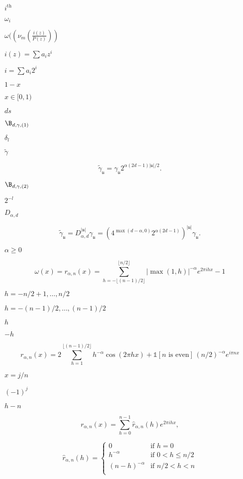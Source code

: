 \documentclass{article}
\begin{document}
$i^{\text{th}}$
\pagebreak

$\omega_i$
\pagebreak

$\omega((\nu_m(\frac{i(z)}{P(z)}))$
\pagebreak

$ i(z) = \sum a_iz^i$
\pagebreak

$i =\sum a_i2^i$
\pagebreak

$1 - x$
\pagebreak

$x \in [0,1)$
\pagebreak

$ d s $
\pagebreak

$\B_{d, \gamma, (1)}$
\pagebreak

$\delta_l $
\pagebreak

$\tilde{\gamma}$
\pagebreak

\[ \tilde{\gamma}_{\mathfrak u} = \gamma_{\mathfrak u} 2^{\alpha (2 d - 1) |\mathfrak u| / 2}.
\]
\pagebreak

$\B_{d, \gamma, (2)}$
\pagebreak

$ 2^{-l}$
\pagebreak

$D_{\alpha, d}$
\pagebreak

\[ \tilde{\gamma}_{\mathfrak u} = D_{\alpha, d}^{|\mathfrak u|} \gamma_{\mathfrak u} = \left(4^{\max(d-\alpha, 0)} 2^{\alpha (2 d - 1)}\right)^{|\mathfrak u|} \gamma_{\mathfrak u}.
\]
\pagebreak

$\alpha \geq 0$
\pagebreak

\[   \omega(x)
   = r_{\alpha,n}(x)
   = \sum_{h = -\lfloor (n-1)/2 \rfloor}^{\lfloor n/2 \rfloor}
     |\max(1, h)|^{-\alpha} e^{2 \pi i h x} - 1
\]
\pagebreak

$h=-n/2+1,\dots,n/2$
\pagebreak

$h=-(n-1)/2,\dots,(n-1)/2$
\pagebreak

$h$
\pagebreak

$-h$
\pagebreak

\[   r_{\alpha,n}(x)
   = 2 \sum_{h=1}^{\lfloor (n-1)/2 \rfloor} h^{-\alpha} \cos(2\pi h x)
   + \mathbb 1[\text{$n$ is even}] \, (n/2)^{-\alpha} e^{i\pi n x}
\]
\pagebreak

$x=j/n$
\pagebreak

$(-1)^j$
\pagebreak

$h-n$
\pagebreak

\[   r_{\alpha,n}(x)
   = \sum_{h=0}^{n-1} \hat r_{\alpha,n}(h) e^{2 \pi i h x},
\]
\pagebreak

\[   \hat r_{\alpha,n}(h) =
   \begin{cases}
     0 & \text{if $h=0$} \\
     h^{-\alpha} & \text{if $0   < h \leq n/2$} \\
     (n-h)^{-\alpha} & \text{if $n/2 < h <    n  $} \\
   \end{cases}
\]
\pagebreak
\end{document}
